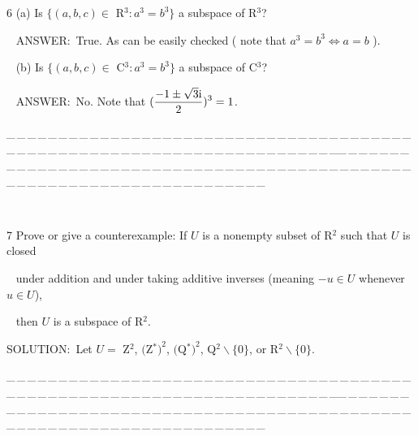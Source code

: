 \documentclass[a4paper, 11pt, UTF8]{article}
\def\i{\textup{i}}
\begin{document}
\begin{large}
{\timesbf\Large 6}
(a) {\timessl\Large Is $\{(a,b,c)\in$ {\timesbf R}$^3:a^3=b^3 \}$ a subspace of {\timesbf R}$^3$?
}\par\,\,\,
{\timesbf A\small{NSWER:}}\,\,\,True. As can be easily checked ( note that $a^3=b^3\Leftrightarrow a=b$ ).\par\,\,\,
(b) {\timessl\Large Is $\{(a,b,c)\in$ {\timesbf C}$^3:a^3=b^3 \}$ a subspace of {\timesbf C}$^3$?
}\par\,\,\,
{\timesbf A\small{NSWER:}}\,\,\,No. Note that $(\displaystyle\frac{-1\pm \sqrt{3}\i}{2})^3=1$.\par
{\tiny \_\,\_\,\_\,\_\,\_\,\_\,\_\,\_\,\_\,\_\,\_\,\_\,\_\,\_\,\_\,\_\,\_\,\_\,\_\,\_\,\_\,\_\,\_\,\_\,\_\,\_\,\_\,\_\,\_\,\_\,\_\,\_\,\_\,\_\,\_\,\_\,\_\,\_\,\_\,\_\,\_\,\_\,\_\,\_\,\_\,\_\,\_\,\_\,\_\,\_\,\_\,\_\,\_\,\_\,\_\,\_\,\_\,\_\,\_\,\_\,\_\,\_\,\_\,\_\,\_\,\_\,\_\,\_\,\_\,\_\,\_\_\,\_\,\_\,\_\,\_\,\_\,\_\,\_\,\_\,\_\,\_\,\_\,\_\,\_\,\_\,\_\,\_\,\_\,\_\,\_\,\_\,\_\,\_\,\_\,\_\,\_\,\_\,\_\,\_\,\_\,\_\,\_\,\_\,\_\,\_\,\_\,\_\,\_\,\_\,\_\,\_\,\_\,\_\,\_\,\_\,\_\,\_\,\_\,\_\,\_\,\_\,\_\,\_\,\_\,\_\,\_\,\_\,\_\,\_\,\_\,\_\,\_\,\_\,\_\,\_\,\_\,\_\,\_\,\_\,\_\,\_}{\tiny\,\par}

{\timesbf\Large 7} {\timessl\Large 
Prove or give a counterexample: If $U$ is a nonempty subset of {\timesbf R}$^2$ such that $U$ is closed}\par\,\,\,
{\timessl\Large
under addition and under taking additive inverses (meaning $−u\in U$ whenever $u\in U$),}\par\,\,\,
{\timessl\Large then $U$ is a subspace of {\timesbf R}$^2$.
}\par
{\timesbf S\footnotesize{OLUTION:}}\,\,\,Let $U=$ {\timesbf Z}$^2$, $(${\timesbf Z}$^*)^2$, $(${\timesbf Q}$^*)^2$, {\timesbf Q}$^2\backslash\{0\}$, or {\timesbf R}$^2\backslash\{0\}$.\par\quad
{\tiny \_\,\_\,\_\,\_\,\_\,\_\,\_\,\_\,\_\,\_\,\_\,\_\,\_\,\_\,\_\,\_\,\_\,\_\,\_\,\_\,\_\,\_\,\_\,\_\,\_\,\_\,\_\,\_\,\_\,\_\,\_\,\_\,\_\,\_\,\_\,\_\,\_\,\_\,\_\,\_\,\_\,\_\,\_\,\_\,\_\,\_\,\_\,\_\,\_\,\_\,\_\,\_\,\_\,\_\,\_\,\_\,\_\,\_\,\_\,\_\,\_\,\_\,\_\,\_\,\_\,\_\,\_\,\_\,\_\,\_\,\_\_\,\_\,\_\,\_\,\_\,\_\,\_\,\_\,\_\,\_\,\_\,\_\,\_\,\_\,\_\,\_\,\_\,\_\,\_\,\_\,\_\,\_\,\_\,\_\,\_\,\_\,\_\,\_\,\_\,\_\,\_\,\_\,\_\,\_\,\_\,\_\,\_\,\_\,\_\,\_\,\_\,\_\,\_\,\_\,\_\,\_\,\_\,\_\,\_\,\_\,\_\,\_\,\_\,\_\,\_\,\_\,\_\,\_\,\_\,\_\,\_\,\_\,\_\,\_\,\_\,\_\,\_\,\_\,\_\,\_\,\_}{\tiny\,\par}


\end{large}
\end{document}
